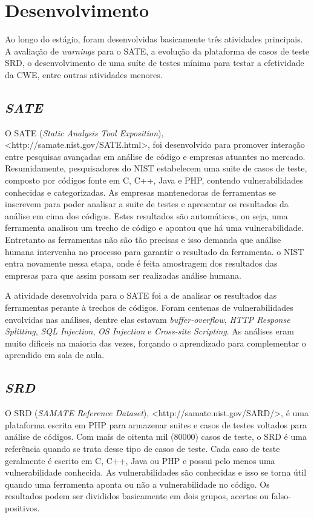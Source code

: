 \chapter{Desenvolvimento}
Ao longo do estágio, foram desenvolvidas basicamente três atividades principais. A avaliação de \textit{warnings} para o SATE, a evolução da plataforma de casos de teste SRD, o desenvolvimento de uma suíte de testes mínima para testar a efetividade da CWE, entre outras atividades menores.


\section{\textit{SATE}}
O SATE (\textit{Static Analysis Tool Exposition}), <http://samate.nist.gov/SATE.html>, foi desenvolvido para promover interação entre pesquisas avançadas em análise de código e empresas atuantes no mercado. Resumidamente, pesquisadores do NIST estabelecem uma suite de casos de teste, composto por códigos fonte em C, C++, Java e PHP, contendo vulnerabilidades conhecidas e categorizadas. As empresas mantenedoras de ferramentas se inscrevem para poder analisar a suite de testes e apresentar os resultados da análise em cima dos códigos. Estes resultados são automáticos, ou seja, uma ferramenta analisou um trecho de código e apontou que há uma vulnerabilidade. Entretanto as ferramentas não são tão precisas e isso demanda que análise humana intervenha no processo para garantir o resultado da ferramenta. o NIST entra novamente nessa etapa, onde é feita amostragem dos resultados das empresas para que assim possam ser realizadas análise humana. 

A atividade desenvolvida para o SATE foi a de analisar os resultados das ferramentas perante à trechos de códigos. Foram centenas de vulnerabilidades envolvidas nas análises, dentre elas estavam \textit{buffer-overflow}, \textit{HTTP Response Splitting}, \textit{SQL Injection}, \textit{OS Injection} e \textit{Cross-site Scripting}. As análises eram muito dificeis na maioria das vezes, forçando o aprendizado para complementar o aprendido em sala de aula.

\section{\textit{SRD}}
O SRD (\textit{SAMATE Reference Dataset}), <http://samate.nist.gov/SARD/>, é uma plataforma escrita em PHP para armazenar suites e casos de testes voltados para análise de códigos. Com mais de oitenta mil (80000) casos de teste, o SRD é uma referência quando se trata desse tipo de casos de teste. Cada caso de teste geralmente é escrito em C, C++, Java ou PHP e possui pelo menos uma vulnerabilidade conhecida. As vulnerabilidades são conhecidas e isso se torna útil quando uma ferramenta aponta ou não a vulnerabilidade no código. Os resultados podem ser divididos basicamente em dois grupos, acertos ou falso-positivos.


